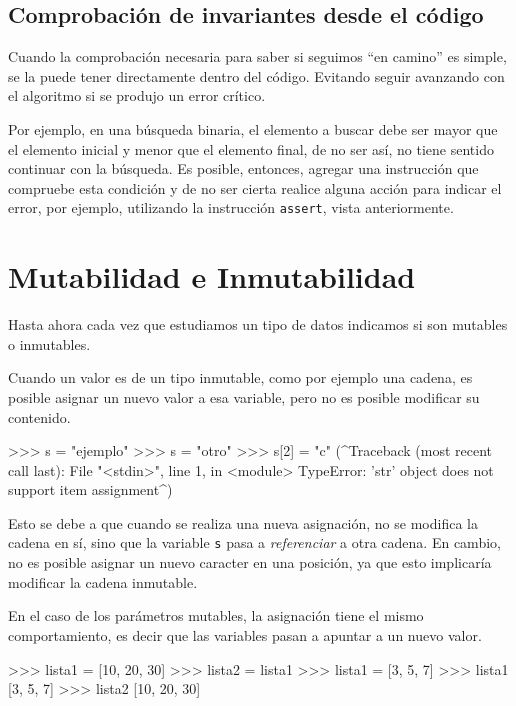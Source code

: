 \subsection{Comprobación de invariantes desde el código}

Cuando la comprobación necesaria para saber si seguimos ``en camino'' es simple,
se la puede tener directamente dentro del código.  Evitando seguir avanzando
con el algoritmo si se produjo un error crítico.

Por ejemplo, en una búsqueda binaria, el elemento a buscar debe ser mayor que
el elemento inicial y menor que el elemento final, de no ser así, no tiene sentido
continuar con la búsqueda.  Es posible, entonces, agregar una instrucción
que compruebe esta condición y de no ser cierta realice alguna acción para
indicar el error, por ejemplo, utilizando la instrucción \lstinline!assert!,
vista anteriormente.

\section{Mutabilidad e Inmutabilidad}

Hasta ahora cada vez que estudiamos un tipo de datos indicamos si son
mutables o inmutables.

Cuando un valor es de un tipo inmutable, como por ejemplo una cadena, es
posible asignar un nuevo valor a esa variable, pero no es posible modificar su
contenido.

\begin{codigo-python-sn}
>>> s = "ejemplo"
>>> s = "otro"
>>> s[2] = "c"
(^Traceback (most recent call last):
  File "<stdin>", line 1, in <module>
TypeError: 'str' object does not support item assignment^)
\end{codigo-python-sn}

Esto se debe a que cuando se realiza una nueva asignación, no se modifica la
cadena en sí, sino que la variable \lstinline!s! pasa a \emph{referenciar} a otra cadena.
En cambio, no es posible asignar un nuevo caracter en una posición, ya que
esto implicaría modificar la cadena inmutable.

En el caso de los parámetros mutables, la asignación tiene el mismo
comportamiento, es decir que las variables pasan a apuntar a un nuevo valor.

\begin{codigo-python-sn}
>>> lista1 = [10, 20, 30]
>>> lista2 = lista1
>>> lista1 = [3, 5, 7]
>>> lista1
[3, 5, 7]
>>> lista2
[10, 20, 30]
\end{codigo-python-sn}


